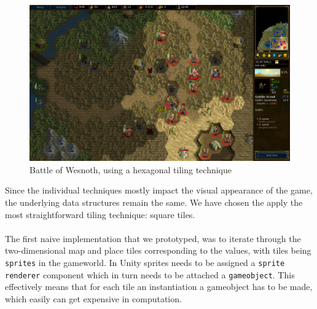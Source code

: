 \begin{figure}[H]
    \centering
    \includegraphics[scale=0.4]{figures/generating_levels/wesnoth_hex.png}
    \caption{Battle of Wesnoth, using a hexagonal tiling technique}\label{fig:wesnoth_hex} 
\end{figure}
Since the individual techniques mostly impact the visual appearance of the game, the underlying data structures remain the same.
We have chosen the apply the most straightforward tiling technique: square tiles.
\\
\\
The first naive implementation that we prototyped, was to iterate through the two-dimensional map and place tiles corresponding to the values, with tiles
being \texttt{sprites} in the gameworld. 
In Unity sprites needs to be assigned a \texttt{sprite renderer} component which in turn needs to be attached a \texttt{gameobject}. 
This effectively means that for each tile an instantiation a gameobject has to be made, which easily can get expensive in computation.


